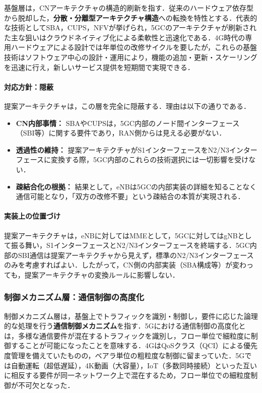 基盤層は，CNアーキテクチャの構造的刷新を指す．従来のハードウェア依存型から脱却した，\textbf{分散・分離型アーキテクチャ構造}への転換を特性とする．代表的な技術としてSBA，CUPS，NFVが挙げられ，5GCのアーキテクチャが刷新された主な狙いはクラウドネイティブ化による柔軟性と迅速化である．4G時代の専用ハードウェアによる設計では年単位の改修サイクルを要したが，これらの基盤技術はソフトウェア中心の設計・運用により，機能の追加・更新・スケーリングを迅速に行え，新しいサービス提供を短期間で実現できる．

\paragraph{対応方針：隠蔽}

提案アーキテクチャは，この層を完全に隠蔽する．理由は以下の通りである．

\begin{itemize}
\item \textbf{CN内部事情：} SBAやCUPSは，5GC内部のノード間インターフェース（SBI等）に関する要件であり，RAN側からは見える必要がない．
\item \textbf{透過性の維持：} 提案アーキテクチャがS1インターフェースをN2/N3インターフェースに変換する際，5GC内部のこれらの技術選択には一切影響を受けない．
\item \textbf{疎結合化の根拠：} 結果として，eNBは5GCの内部実装の詳細を知ることなく通信可能となり，「双方の改修不要」という疎結合の本質が実現される．
\end{itemize}

\paragraph{実装上の位置づけ}

提案アーキテクチャは，eNBに対してはMMEとして，5GCに対してはgNBとして振る舞い，S1インターフェースとN2/N3インターフェースを終端する．5GC内部のSBI通信は提案アーキテクチャから見えず，標準のN2/N3インターフェースのみを考慮すればよい．したがって，CN側の内部実装（SBA構成等）が変わっても，提案アーキテクチャの変換ルールに影響しない．

\subsubsection{制御メカニズム層：通信制御の高度化}

制御メカニズム層は，基盤上でトラフィックを識別・制御し，要件に応じた論理的な処理を行う\textbf{通信制御メカニズム}を指す．5Gにおける通信制御の高度化とは，多様な通信要件が混在するトラフィックを識別し，フロー単位で細粒度に制御することが可能になったことを意味する．4GはQoSクラス（QCI）による優先度管理を備えていたものの，ベアラ単位の粗粒度な制御に留まっていた．5Gでは自動運転（超低遅延），4K動画（大容量），IoT（多数同時接続）といった互いに相反する要件が同一ネットワーク上で混在するため，フロー単位での細粒度制御が不可欠となった．

